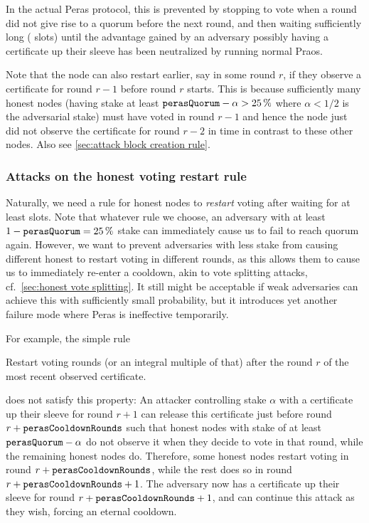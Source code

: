 \medskip
In the actual Peras protocol, this is prevented by stopping to vote when a round did not give rise to a quorum before the next round, and then waiting sufficiently long (\Theal{} slots) until the advantage gained by an adversary possibly having a certificate up their sleeve has been neutralized by running normal Praos.

Note that the node can also restart earlier, say in some round $r$, if they observe a certificate for round $r-1$ before round $r$ starts.
This is because sufficiently many honest nodes (having stake at least $\mathtt{perasQuorum} - \alpha > \qty{25}{\percent}$ where $\alpha<1/2$ is the adversarial stake) must have voted in round $r-1$ and hence the node just did not observe the certificate for round $r-2$ in time in contrast to these other nodes.
Also see \cref{sec:attack block creation rule}.

\subsubsection{Attacks on the honest voting restart rule}

Naturally, we need a rule for honest nodes to \emph{restart} voting after waiting for at least \Theal{} slots.
Note that whatever rule we choose, an adversary with at least $1-\mathtt{perasQuorum} = \qty{25}{\percent}$ stake can immediately cause us to fail to reach quorum again.
However, we want to prevent adversaries with less stake from causing different honest to restart voting in different rounds, as this allows them to cause us to immediately re-enter a cooldown, akin to vote splitting attacks, cf.~\cref{sec:honest vote splitting}.
It still might be acceptable if weak adversaries can achieve this with sufficiently small probability, but it introduces yet another failure mode where Peras is ineffective temporarily.

For example, the simple rule
\begin{tcolorbox}
  Restart voting \perasCooldownRounds{} rounds (or an integral multiple of that) after the round $r$ of the most recent observed certificate.
\end{tcolorbox}
\parindent0pt
does not satisfy this property:
An attacker controlling stake $\alpha$ with a certificate up their sleeve for round $r+1$ can release this certificate just before round $r+\mathtt{perasCooldownRounds}$ such that honest nodes with stake of at least $\mathtt{perasQuorum} - \alpha$ do not observe it when they decide to vote in that round, while the remaining honest nodes do.
Therefore, some honest nodes restart voting in round $r+\mathtt{perasCooldownRounds}$, while the rest does so in round $r+\mathtt{perasCooldownRounds}+1$.
The adversary now has a certificate up their sleeve for round $r+\mathtt{perasCooldownRounds}+1$, and can continue this attack as they wish, forcing an eternal cooldown.


